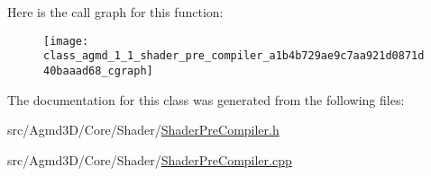 Here is the call graph for this function\+:\nopagebreak
\begin{figure}[H]
\begin{center}
\leavevmode
\texttt{[image: class\_agmd\_1\_1\_shader\_pre\_compiler\_a1b4b729ae9c7aa921d0871d40baaad68\_cgraph]}
\end{center}
\end{figure}




The documentation for this class was generated from the following files\+:\begin{DoxyCompactItemize}
\item 
src/\+Agmd3\+D/\+Core/\+Shader/\hyperlink{_shader_pre_compiler_8h}{Shader\+Pre\+Compiler.\+h}\item 
src/\+Agmd3\+D/\+Core/\+Shader/\hyperlink{_shader_pre_compiler_8cpp}{Shader\+Pre\+Compiler.\+cpp}\end{DoxyCompactItemize}
